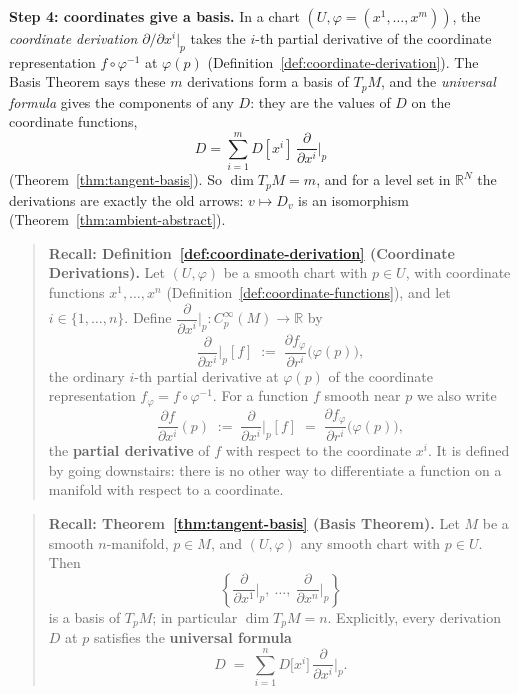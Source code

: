 \documentclass[11pt]{report}
\begin{document}
\textbf{Step 4: coordinates give a basis.} In a chart $(U, \varphi = (x^1, \ldots, x^m))$, the \emph{coordinate derivation} $\partial/\partial x^i|_p$ takes the $i$-th partial derivative of the coordinate representation $f \circ \varphi^{-1}$ at $\varphi(p)$ (Definition~\ref{def:coordinate-derivation}). The Basis Theorem says these $m$ derivations form a basis of $T_pM$, and the \emph{universal formula} gives the components of any $D$: they are the values of $D$ on the coordinate functions,
\[
D = \sum_{i=1}^m D[x^i]\, \frac{\partial}{\partial x^i}\Big|_p
\]
(Theorem~\ref{thm:tangent-basis}). So $\dim T_pM = m$, and for a level set in $\mathbb{R}^N$ the derivations are exactly the old arrows: $v \mapsto D_v$ is an isomorphism (Theorem~\ref{thm:ambient-abstract}).

\begin{quote}
\textbf{Recall: Definition~\ref{def:coordinate-derivation} (Coordinate Derivations).} Let $(U,\varphi)$ be a smooth chart with $p \in U$, with coordinate functions $x^1, \ldots, x^n$ (Definition~\ref{def:coordinate-functions}), and let $i \in \{1,\ldots,n\}$. Define $\dfrac{\partial}{\partial x^i}\Big|_p : C_p^\infty(M) \to \mathbb{R}$ by
\[
\frac{\partial}{\partial x^i}\Big|_p [f] \;:=\; \frac{\partial f_\varphi}{\partial r^i}\big(\varphi(p)\big),
\]
the ordinary $i$-th partial derivative at $\varphi(p)$ of the coordinate representation $f_\varphi = f \circ \varphi^{-1}$. For a function $f$ smooth near $p$ we also write
\[
\frac{\partial f}{\partial x^i}(p) \;:=\; \frac{\partial}{\partial x^i}\Big|_p [f] \;=\; \frac{\partial f_\varphi}{\partial r^i}\big(\varphi(p)\big),
\]
the \textbf{partial derivative} of $f$ with respect to the coordinate $x^i$. It is defined by going downstairs: there is no other way to differentiate a function on a manifold with respect to a coordinate.
\end{quote}

\begin{quote}
\textbf{Recall: Theorem~\ref{thm:tangent-basis} (Basis Theorem).} Let $M$ be a smooth $n$-manifold, $p \in M$, and $(U, \varphi)$ any smooth chart with $p \in U$. Then
\[
\left\{ \frac{\partial}{\partial x^1}\Big|_p, \ \ldots, \ \frac{\partial}{\partial x^n}\Big|_p \right\}
\]
is a basis of $T_pM$; in particular $\dim T_pM = n$. Explicitly, every derivation $D$ at $p$ satisfies the \textbf{universal formula}
\[
D \;=\; \sum_{i=1}^n D\big[x^i\big]\, \frac{\partial}{\partial x^i}\Big|_p .
\]
\end{quote}
\end{document}
